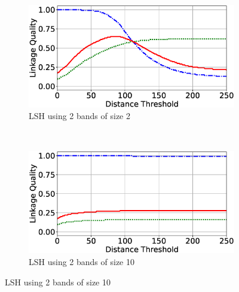 \documentclass{llncs}
\begin{document}
\begin{figure}
\begin{subfigure}{.47\textwidth}
  \centering
\includegraphics[width=\textwidth]{figures/plotLQ-cora-lsh-2-2}
\caption{LSH using 2 bands of size 2}
\end{subfigure}%
~~
\begin{subfigure}{.47\textwidth}
  \centering
\includegraphics[width=\textwidth]{figures/plotLQ-cora-lsh-2-10}
\caption{LSH using 2 bands of size 10}
\end{subfigure} %


\end{figure}
\end{document}
